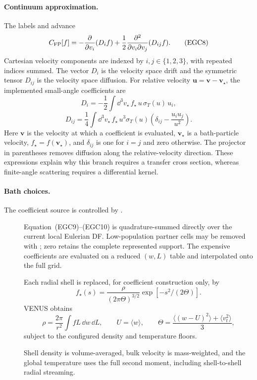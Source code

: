 \paragraph{Continuum approximation.}
The labels  and  advance
\[
 C_{\rm FP}[f]
 =-\frac{\partial}{\partial v_i}(D_i f)
  +\frac12\frac{\partial^2}{\partial v_i\partial v_j}
                  (D_{ij}f).                             \tag{EGC8}
\]
Cartesian velocity components are indexed by \(i,j\in\{1,2,3\}\), with
repeated indices summed.  The vector \(D_i\) is the velocity space drift and
the symmetric tensor \(D_{ij}\) is the velocity space diffusion.
For relative velocity
\(\boldsymbol u=\boldsymbol v-\boldsymbol v_\star\), the implemented
small-angle coefficients are
\[
 D_i=-\frac12\int\dd^3v_\star\,
 f_\star\,u\,\sigma_T(u)\,u_i,                            \tag{EGC9}
\]
\[
 D_{ij}=\frac14\int\dd^3v_\star\,
 f_\star\,u^3\sigma_T(u)
 \left(\delta_{ij}-\frac{u_i u_j}{u^2}\right).            \tag{EGC10}
\]
Here \(\boldsymbol v\) is the velocity at which a coefficient is evaluated,
\(\boldsymbol v_\star\) is a bath-particle velocity,
\(f_\star=f(\boldsymbol v_\star)\), and \(\delta_{ij}\) is one for \(i=j\)
and zero otherwise.  The projector in parentheses removes diffusion along
the relative-velocity direction.
These expressions explain why this branch requires a transfer cross section,
whereas finite-angle scattering requires a differential kernel.

\paragraph{Bath choices.}
The coefficient source is controlled by .
\begin{description}
\item[] Equation~(EGC9)--(EGC10) is quadrature-summed
      directly over the current local Eulerian DF.  Low-population partner
      cells may be removed with ; zero retains the
      complete represented support.  The expensive coefficients are evaluated
      on a reduced \((w,L)\) table and interpolated onto the full grid.
\item[] Each radial shell is replaced, for coefficient
      construction only, by
      \[
       f_\star(s)=\frac{\rho}
       {(2\pi\Theta)^{3/2}}\exp[-s^2/(2\Theta)].           \tag{EGC11}
      \]
      VENUS obtains
      \[
       \rho=\frac{2\pi}{r^2}\int fL\,\dd w\,\dd L,\qquad
       U=\langle w\rangle,\qquad
       \Theta=\frac{\langle(w-U)^2\rangle+\langle v_t^2\rangle}{3},
                                                               \tag{EGC12}
      \]
      subject to the configured density and temperature floors.
\item[] Shell density is volume-averaged, bulk velocity
      is mass-weighted, and the global temperature uses the full second moment,
      including shell-to-shell radial streaming.
\end{description}

